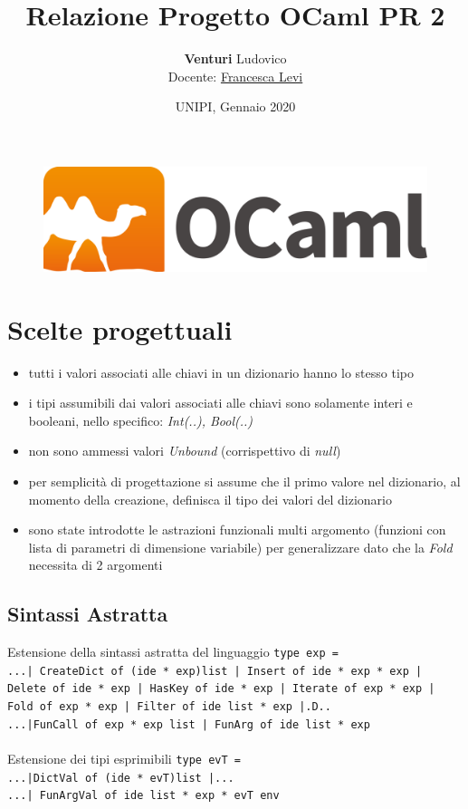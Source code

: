 \documentclass[10pt, a4paper]{article}
\title{\textbf{Relazione Progetto OCaml PR 2}}
\author{\textbf{Venturi} Ludovico\\Docente: \href{http://pages.di.unipi.it/levi/}{Francesca Levi}}
\date{UNIPI, Gennaio 2020}
\begin{document}
\maketitle
\tableofcontents
\vfill
\begin{figure}[h]
	\centering
	\includegraphics[scale=0.3]{ocaml_logo}
	\label{fig:0}
\end{figure}

\clearpage

\section{Scelte progettuali}
\begin{itemize}
\item tutti i valori associati alle chiavi in un dizionario hanno lo stesso tipo
\item i tipi assumibili dai valori associati alle chiavi sono solamente interi e booleani, nello specifico: \textit{Int(..), Bool(..)}
\item non sono ammessi valori \textit{Unbound} (corrispettivo di \textit{null})
\item per semplicità di progettazione si assume che il primo valore nel dizionario, al momento della creazione, definisca il tipo dei valori del dizionario
\item sono state introdotte le astrazioni funzionali multi argomento (funzioni con lista di parametri di dimensione variabile) per generalizzare dato che la \textit{Fold} necessita di 2 argomenti
\end{itemize}
\subsection{Sintassi Astratta}
Estensione della sintassi astratta del linguaggio  \texttt{type exp = }\\
\texttt{...| CreateDict of (ide * exp)list | Insert of ide * exp * exp | Delete of  ide * exp | HasKey of ide * exp | Iterate of exp * exp	|
Fold of exp * exp | Filter of ide list * exp 	|.D..\\
...|FunCall of exp * exp list | FunArg of ide list * exp}\\\\
Estensione dei tipi esprimibili	\texttt{type evT = }\\
\texttt{...|DictVal of (ide * evT)list |...\\...| FunArgVal of ide list * exp * evT env }
\end{document}
